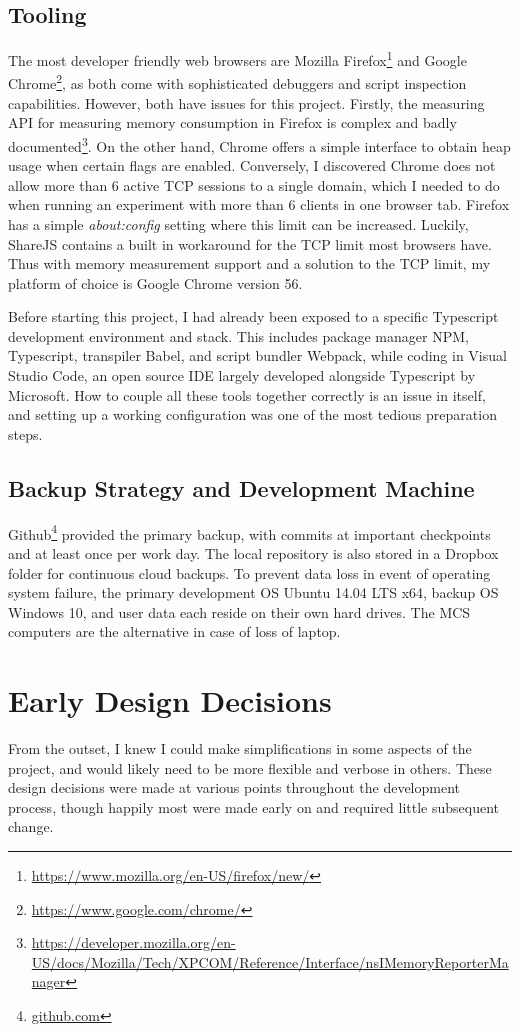 \documentclass[12pt,a4paper,twoside,openright]{report}
\begin{document}
	\subsection{Tooling}
	The most developer friendly web browsers are Mozilla Firefox\footnote{\url{https://www.mozilla.org/en-US/firefox/new/}} and Google Chrome\footnote{\url{https://www.google.com/chrome/}}, as both come with sophisticated debuggers and script inspection capabilities. However, both have issues for this project. Firstly, the measuring API for measuring memory consumption in Firefox is complex and badly documented\footnote{\url{https://developer.mozilla.org/en-US/docs/Mozilla/Tech/XPCOM/Reference/Interface/nsIMemoryReporterManager}}. On the other hand, Chrome offers a simple interface to obtain heap usage when certain flags are enabled. Conversely, I discovered Chrome does not allow more than 6 active TCP sessions to a single domain, which I needed to do when running an experiment with more than 6 clients in one browser tab. Firefox has a simple \textit{about:config} setting where this limit can be increased. Luckily, ShareJS contains a built in workaround for the TCP limit most browsers have. Thus with memory measurement support and a solution to the TCP limit, my platform of choice is Google Chrome version 56.
	
	Before starting this project, I had already been exposed to a specific Typescript development environment and stack. This includes package manager NPM, Typescript, transpiler Babel, and script bundler Webpack, while coding in Visual Studio Code, an open source IDE largely developed alongside Typescript by Microsoft. How to couple all these tools together correctly is an issue in itself, and setting up a working configuration was one of the most tedious preparation steps.
	
	\subsection{Backup Strategy and Development Machine}
	Github\footnote{\url{github.com}} provided the primary backup, with commits at important checkpoints and at least once per work day. The local repository is also stored in a Dropbox folder for continuous cloud backups. To prevent data loss in event of operating system failure, the primary development OS Ubuntu 14.04 LTS x64, backup OS Windows 10, and user data each reside on their own hard drives. The MCS computers are the alternative in case of loss of laptop.
	
	
\section{Early Design Decisions}
From the outset, I knew I could make simplifications in some aspects of the project, and would likely need to be more flexible and verbose in others. These design decisions were made at various points throughout the development process, though happily most were made early on and required little subsequent change. 
\end{document}
